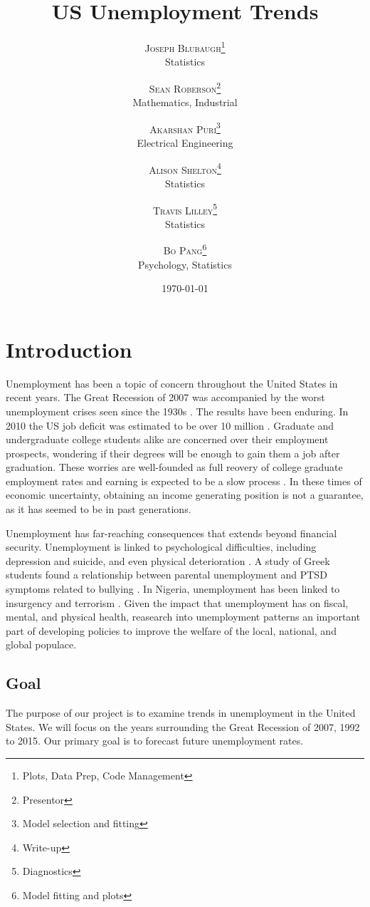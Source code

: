 \documentclass[twoside,twocolumn]{article}
\title{US Unemployment Trends} %
\author{%
\textsc{Joseph Blubaugh}\thanks{Plots, Data Prep, Code Management} \\[1ex] %
\normalsize Statistics\\ %
\and %
\textsc{Sean Roberson}\thanks{Presentor} \\[1ex] %
\normalsize Mathematics, Industrial\\ %
\and 
\textsc{Akarshan Puri}\thanks{Model selection and fitting} \\[1ex] 
\normalsize Electrical Engineering\\ 
\and 
\textsc{Alison Shelton}\thanks{Write-up} \\[1ex] 
\normalsize Statistics\\ 
\and 
\textsc{Travis Lilley}\thanks{Diagnostics} \\[1ex] 
\normalsize Statistics\\ 
\and
\textsc{Bo Pang}\thanks{Model fitting and plots} \\[1 ex]
\normalsize Psychology, Statistics
\vspace*{.5 cm}
}
\date{\today \vspace*{.25 cm}} %
\begin{document}
\maketitle



\section{Introduction}
		Unemployment has been a topic of concern throughout the United States in recent years.  The Great Recession of 2007 was accompanied by the worst unemployment crises seen since the 1930s \citep{wanberg2012individual}.   The results have been enduring. In 2010 the US job deficit was estimated to be over 10 million \citep{katz2010}. Graduate and undergraduate college students alike are concerned over their employment prospects, wondering if their degrees will be enough to gain them a job after graduation.  These worries are well-founded as full reovery of college graduate employment rates and earning is expected to be a slow process \citep{carnevale2015hard}.  In these times of economic uncertainty, obtaining an income generating position is not a guarantee, as it has seemed to be in past generations.
		
Unemployment has far-reaching consequences that extends beyond financial security. Unemployment is linked to psychological difficulties, including depression and suicide, and even physical deterioration \citep{wanberg2012individual, insecure, suicide}. A study of Greek students found a relationship between parental unemployment and PTSD symptoms related to bullying \citep{kanellopoulos2014epa}. In Nigeria, unemployment has been linked to insurgency and terrorism \citep{terrorism}. Given the impact that unemployment has on fiscal, mental, and physical health, reasearch into unemployment patterns an important part of developing policies to improve the welfare of the local, national, and global populace.

\subsection{Goal}
		The purpose of our project is to examine trends in unemployment in the United States. We will focus on the years surrounding the Great Recession of 2007, 1992 to 2015.  Our primary goal is to forecast future unemployment rates. 
\end{document}
